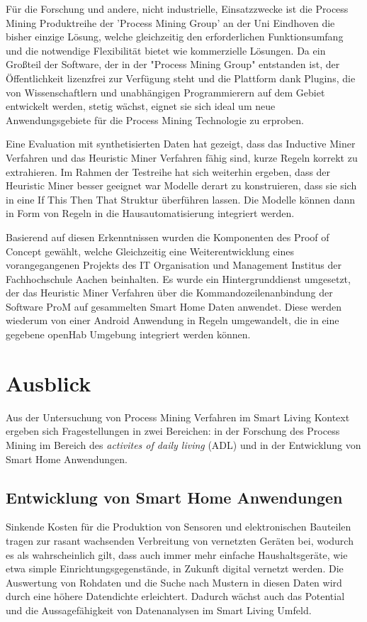 Für die Forschung und andere, nicht industrielle, Einsatzzwecke ist die Process Mining Produktreihe der 'Process Mining Group' an der Uni Eindhoven die bisher einzige Lösung, welche gleichzeitig den erforderlichen Funktionsumfang und die notwendige Flexibilität bietet wie kommerzielle Lösungen. Da ein Großteil der Software, der in der "Process Mining Group" entstanden ist, der Öffentlichkeit lizenzfrei zur Verfügung steht und die Plattform dank Plugins, die von Wissenschaftlern und unabhängigen Programmierern auf dem Gebiet entwickelt werden, stetig wächst, eignet sie sich ideal um neue Anwendungsgebiete für die Process Mining Technologie zu erproben.

Eine Evaluation mit synthetisierten Daten hat gezeigt, dass das Inductive Miner Verfahren und das Heuristic Miner Verfahren fähig sind, kurze Regeln korrekt zu extrahieren. Im Rahmen der Testreihe hat sich weiterhin ergeben, dass der Heuristic Miner besser geeignet war Modelle derart zu konstruieren, dass sie sich in eine If This Then That Struktur überführen lassen. Die Modelle können dann in Form von Regeln in die Hausautomatisierung integriert werden.

Basierend auf diesen Erkenntnissen wurden die Komponenten des Proof of Concept gewählt, welche Gleichzeitig eine Weiterentwicklung eines vorangegangenen Projekts des IT Organisation und Management Institus der Fachhochschule Aachen beinhalten. Es wurde ein Hintergrunddienst umgesetzt, der das Heuristic Miner Verfahren über die Kommandozeilenanbindung der Software ProM auf gesammelten Smart Home Daten anwendet. Diese werden wiederum von einer Android Anwendung in Regeln umgewandelt, die in eine gegebene openHab Umgebung integriert werden können.
\newpage
\section{Ausblick}
Aus der Untersuchung von Process Mining Verfahren im Smart Living Kontext ergeben sich Fragestellungen in zwei Bereichen: in der Forschung des Process Mining im Bereich des \textit{activites of daily living} (ADL) und in der Entwicklung von Smart Home Anwendungen.

\subsection{Entwicklung von Smart Home Anwendungen}
Sinkende Kosten für die Produktion von Sensoren und elektronischen Bauteilen tragen zur rasant wachsenden Verbreitung von vernetzten Geräten bei, wodurch es als wahrscheinlich gilt, dass auch immer mehr einfache Haushaltsgeräte, wie etwa simple Einrichtungsgegenstände, in Zukunft digital vernetzt werden. Die Auswertung von Rohdaten und die Suche nach Mustern in diesen Daten wird durch eine höhere Datendichte erleichtert. Dadurch wächst auch das Potential und die Aussagefähigkeit von Datenanalysen im Smart Living Umfeld.

